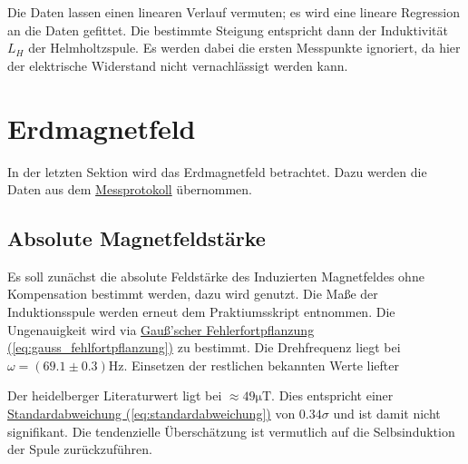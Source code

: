 Die Daten lassen einen linearen Verlauf vermuten; es wird eine lineare Regression an die Daten gefittet. Die bestimmte Steigung entspricht dann der Induktivität $L_H$ der Helmholtzspule. Es werden dabei die ersten Messpunkte ignoriert, da hier der elektrische Widerstand nicht vernachlässigt werden kann. 

\section{Erdmagnetfeld}
\label{sec:A3}
In der letzten Sektion wird das Erdmagnetfeld betrachtet. Dazu werden die Daten aus dem \hyperref[ch:Protokoll]{Messprotokoll} übernommen.

\subsection{Absolute Magnetfeldstärke}
Es soll zunächst die absolute Feldstärke des Induzierten Magnetfeldes ohne Kompensation bestimmt werden, dazu wird  genutzt.
Die Maße der Induktionsspule werden erneut dem Praktiumsskript entnommen. Die Ungenauigkeit wird via \hyperref[eq:gauss_fehlfortpflanzung]{Gauß'scher Fehlerfortpflanzung (\ref*{eq:gauss_fehlfortpflanzung})} zu
bestimmt. Die Drehfrequenz liegt bei $\omega = (69.1 \pm 0.3)$Hz. Einsetzen der restlichen bekannten Werte liefter

Der heidelberger Literaturwert ligt bei $\approx 49 \mathrm{\mu T}$. Dies entspricht einer \hyperref[eq:standardabweichung]{Standardabweichung (\ref*{eq:standardabweichung})} von $0.34\sigma$ und ist damit nicht signifikant. 
Die tendenzielle Überschätzung ist vermutlich auf die Selbsinduktion der Spule zurückzuführen.

